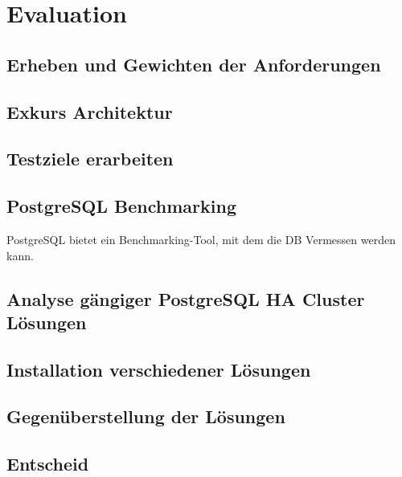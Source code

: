 
\section{Evaluation}
\subsection{Erheben und Gewichten der Anforderungen}

\subsection{Exkurs Architektur}





\subsection{Testziele erarbeiten}
\subsection{PostgreSQL Benchmarking}
PostgreSQL bietet ein Benchmarking-Tool,\cite{TYJFF7AB,VXNYQFTE} mit dem die DB Vermessen werden kann.
\subsection{Analyse gängiger PostgreSQL HA Cluster Lösungen}








\subsection{Installation verschiedener Lösungen}

\subsection{Gegenüberstellung der Lösungen}

\subsection{Entscheid}